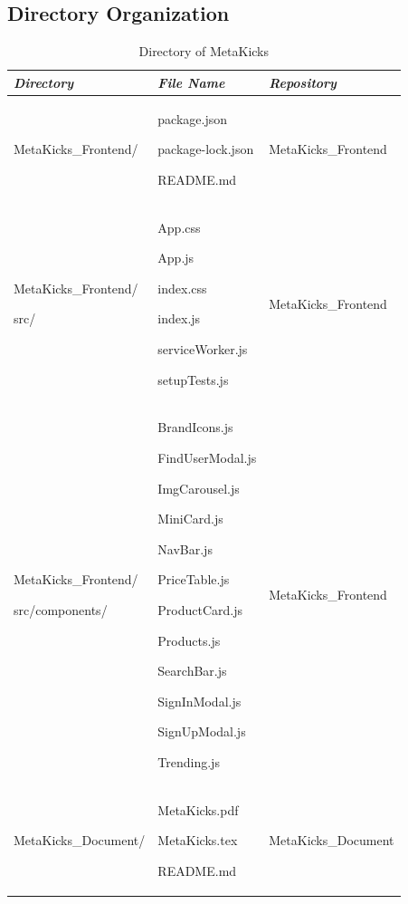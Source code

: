 \documentclass[conference]{IEEEtran}
\begin{document}
\subsection{Directory Organization}
\begin{table}[h]
\caption{Directory of MetaKicks}
\def\arraystretch{1.24} \small
    \begin{tabular}{|p{2.8cm}|p{2.4cm}|p{2.7cm}|}
        \hline
        \textbf{\textit{Directory}} & \textbf{\textit{File Name}} & \textbf{\textit{Repository}} \\ \hline
        MetaKicks\_Frontend/ & package.json \par package-lock.json \par README.md & MetaKicks\_Frontend\\ \hline
         
        MetaKicks\_Frontend/\par src/ \par & App.css \par App.js \par index.css \par index.js \par serviceWorker.js \par 					setupTests.js \par  & MetaKicks\_Frontend\\ \hline
	
	MetaKicks\_Frontend/\par src/components/ & BrandIcons.js \par FindUserModal.js \par ImgCarousel.js \par MiniCard.js \par NavBar.js \par PriceTable.js \par ProductCard.js \par Products.js \par SearchBar.js \par SignInModal.js \par SignUpModal.js \par Trending.js & MetaKicks\_Frontend\\ \hline
MetaKicks\_Document/ & MetaKicks.pdf \par MetaKicks.tex \par README.md & MetaKicks\_Document\\ \hline
\end{tabular}
\end{table}
\end{document}
